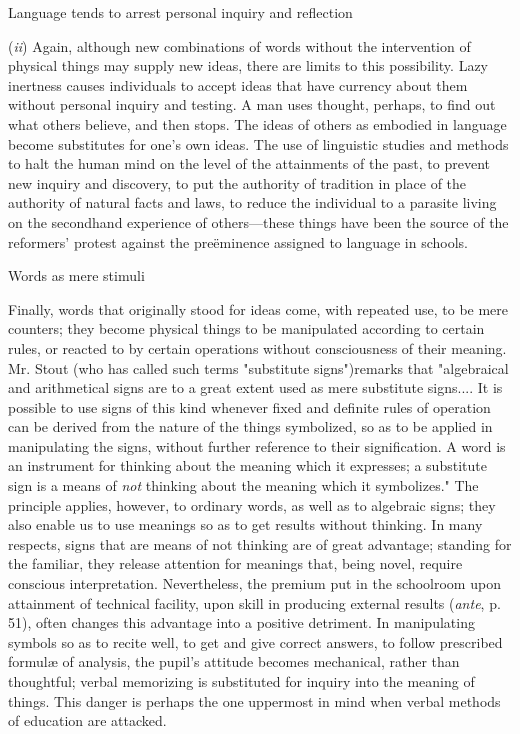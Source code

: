 \documentclass[letterpaper]{book}
\begin{document}
Language tends to arrest personal inquiry and reflection

(\emph{ii}) Again, although new combinations of words without the
intervention of physical things may supply new ideas, there are limits
to this possibility. Lazy inertness causes individuals to accept ideas
that have currency about them without personal inquiry and testing. A
man uses thought, perhaps, to find out what others believe, and then
stops. The ideas of others as embodied in language become substitutes
for one's own ideas. The use of linguistic studies and methods to halt
the human mind on the level of the attainments of the past, to prevent
new inquiry and discovery, to put the authority of tradition in place of
the authority of natural facts and laws, to reduce the individual to a
parasite living on the secondhand experience of others---these things
have been the source of the reformers' protest against the preëminence
assigned to language in schools.

Words as mere stimuli

Finally, words that originally stood for ideas come, with repeated use,
to be mere counters; they become physical things to be manipulated
according to certain rules, or reacted to by certain operations without
consciousness of their meaning. Mr. Stout (who has called such terms
"substitute signs")remarks that "algebraical and arithmetical signs are
to a great extent used as mere substitute signs.... It is possible to
use signs of this kind whenever fixed and definite rules of
operation
can be derived from the nature of the things symbolized, so as to be
applied in manipulating the signs, without further reference to their
signification. A word is an instrument for thinking about the meaning
which it expresses; a substitute sign is a means of \emph{not} thinking
about the meaning which it symbolizes." The principle applies, however,
to ordinary words, as well as to algebraic signs; they also enable us to
use meanings so as to get results without thinking. In many respects,
signs that are means of not thinking are of great advantage; standing
for the familiar, they release attention for meanings that, being novel,
require conscious interpretation. Nevertheless, the premium put in the
schoolroom upon attainment of technical facility, upon skill in
producing external results (\emph{ante}, p. 51), often changes this
advantage into a positive detriment. In manipulating symbols so as to
recite well, to get and give correct answers, to follow prescribed
formulæ of analysis, the pupil's attitude becomes mechanical, rather
than thoughtful; verbal memorizing is substituted for inquiry into the
meaning of things. This danger is perhaps the one uppermost in mind when
verbal methods of education are attacked.
\end{document}

